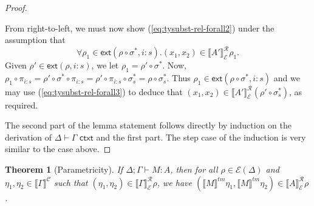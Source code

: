 \documentclass[natbib,preprint]{sigplanconf}
\newcommand{\isCtxt}{\textsf{ ctxt}}
\newcommand{\relEnv}[1]{\mathcal{#1}}
\newcommand{\ctxtSem}[1]{\llbracket #1 \rrbracket^{\mathcal{C}}}
\newcommand{\tmSem}[1]{\llbracket #1 \rrbracket^{\mathit{tm}}}
\newcommand{\rsem}[3]{\llbracket #1 \rrbracket^{\mathcal{R}}_{#2}{#3}}
\newcommand{\extends}[2]{\mathsf{ext}(#1,#2)}
\newtheorem{theorem}{Theorem}
\begin{document}
\begin{proof}
\begin{description}
    From right-to-left, we must now show
    (\ref{eq:tysubst-rel-forall2}) under the assumption that
    \begin{equation}
      \label{eq:tysubst-rel-forall3}
      \forall \rho_1 \in \extends{\rho \circ \sigma^*}{i:s}. (x_1,x_2) \in \rsem{A'}{\relEnv{E}}{\rho_1}.
    \end{equation}
    Given $\rho' \in \extends{\rho}{i:s}$, we let $\rho_1 = \rho'
    \circ \sigma^*$. Now, $\rho_1 \circ \pi_{i:s} = \rho' \circ
    \sigma^* \circ \pi_{i:s} = \rho' \circ \pi_{i:s} \circ \sigma_s^{*}
    = \rho \circ \sigma_s^{*}$. Thus $\rho_1 \in \extends{\rho \circ
      \sigma^*}{i:s}$ and we may use (\ref{eq:tysubst-rel-forall3}) to
    deduce that $(x_1,x_2) \in \rsem{A'}{\relEnv{E}}{(\rho' \circ \sigma_s^{*})}$,
    as required.
  \end{description}
  The second part of the lemma statement follows directly by induction
  on the derivation of $\Delta \vdash \Gamma \isCtxt$ and the first
  part. The step case of the induction is very similar to the
   case above.
\end{proof}

\begin{theorem}[Parametricity]
  If $\Delta; \Gamma \vdash M : A$, then for all $\rho \in
  \relEnv{E}(\Delta)$ and $\eta_1, \eta_2 \in \ctxtSem{\Gamma}$ such
  that $(\eta_1, \eta_2) \in \rsem{\Gamma}{\relEnv{E}}\rho$, we have
  $(\tmSem{M}\eta_1, \tmSem{M}\eta_2) \in \rsem{A}{\relEnv{E}}\rho$.
\end{theorem}
\end{document}
